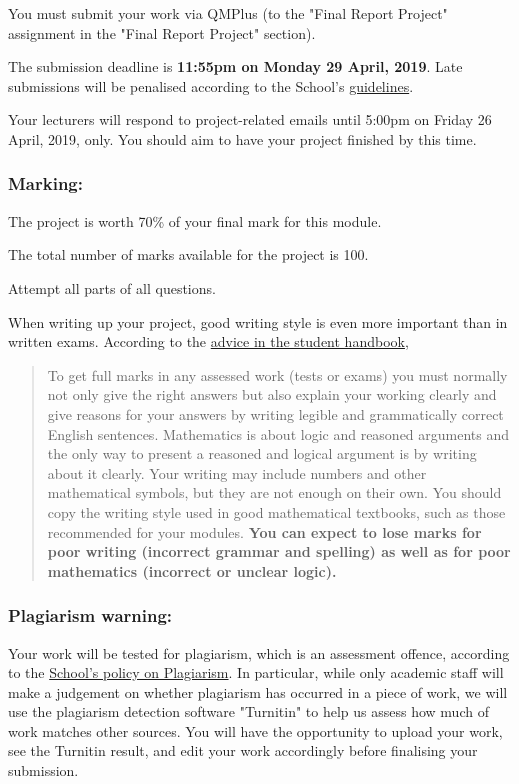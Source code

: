 \documentclass[11pt]{article}
\begin{document}
You must submit your work via QMPlus (to the "Final Report Project"
assignment in the "Final Report Project" section).

The submission deadline is \textbf{11:55pm on Monday 29 April, 2019}.
Late submissions will be penalised according to the School's
\href{https://qmplus.qmul.ac.uk/mod/book/view.php?id=807735\&chapterid=89105}{guidelines}.

Your lecturers will respond to project-related emails until 5:00pm on
Friday 26 April, 2019, only. You should aim to have your project
finished by this time.

\subsubsection{Marking:}\label{marking}

The project is worth 70\% of your final mark for this module.

The total number of marks available for the project is 100.

Attempt all parts of all questions.

When writing up your project, good writing style is even more important
than in written exams. According to the
\href{https://qmplus.qmul.ac.uk/mod/book/view.php?id=807735\&chapterid=87786}{advice
in the student handbook},

\begin{quote}
To get full marks in any assessed work (tests or exams) you must
normally not only give the right answers but also explain your working
clearly and give reasons for your answers by writing legible and
grammatically correct English sentences. Mathematics is about logic and
reasoned arguments and the only way to present a reasoned and logical
argument is by writing about it clearly. Your writing may include
numbers and other mathematical symbols, but they are not enough on their
own. You should copy the writing style used in good mathematical
textbooks, such as those recommended for your modules. \textbf{You can
expect to lose marks for poor writing (incorrect grammar and spelling)
as well as for poor mathematics (incorrect or unclear logic).}
\end{quote}

\subsubsection{Plagiarism warning:}\label{plagiarism-warning}

Your work will be tested for plagiarism, which is an assessment offence,
according to the
\href{https://qmplus.qmul.ac.uk/mod/book/view.php?id=807735\&chapterid=87787}{School's
policy on Plagiarism}. In particular, while only academic staff will
make a judgement on whether plagiarism has occurred in a piece of work,
we will use the plagiarism detection software "Turnitin" to help us
assess how much of work matches other sources. You will have the
opportunity to upload your work, see the Turnitin result, and edit your
work accordingly before finalising your submission.
\end{document}

